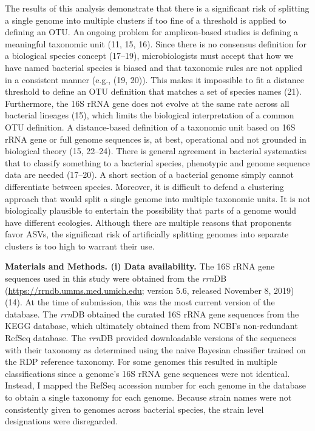 \documentclass[
]{article}
\begin{document}
The results of this analysis demonstrate that there is a significant
risk of splitting a single genome into multiple clusters if too fine of
a threshold is applied to defining an OTU. An ongoing problem for
amplicon-based studies is defining a meaningful taxonomic unit (11, 15,
16). Since there is no consensus definition for a biological species
concept (17--19), microbiologists must accept that how we have named
bacterial species is biased and that taxonomic rules are not applied in
a consistent manner (e.g., (19, 20)). This makes it impossible to fit a
distance threshold to define an OTU definition that matches a set of
species names (21). Furthermore, the 16S rRNA gene does not evolve at
the same rate across all bacterial lineages (15), which limits the
biological interpretation of a common OTU definition. A distance-based
definition of a taxonomic unit based on 16S rRNA gene or full genome
sequences is, at best, operational and not grounded in biological theory
(15, 22--24). There is general agreement in bacterial systematics that
to classify something to a bacterial species, phenotypic and genome
sequence data are needed (17--20). A short section of a bacterial genome
simply cannot differentiate between species. Moreover, it is difficult
to defend a clustering approach that would split a single genome into
multiple taxonomic units. It is not biologically plausible to entertain
the possibility that parts of a genome would have different ecologies.
Although there are multiple reasons that proponents favor ASVs, the
significant risk of artificially splitting genomes into separate
clusters is too high to warrant their use.

\vspace{20mm}

\textbf{Materials and Methods. (i) Data availability.} The 16S rRNA gene
sequences used in this study were obtained from the \emph{rrn}DB
(\url{https://rrndb.umms.med.umich.edu}; version 5.6, released November
8, 2019) (14). At the time of submission, this was the most current
version of the database. The \emph{rrn}DB obtained the curated 16S rRNA
gene sequences from the KEGG database, which ultimately obtained them
from NCBI's non-redundant RefSeq database. The \emph{rrn}DB provided
downloadable versions of the sequences with their taxonomy as determined
using the naive Bayesian classifier trained on the RDP reference
taxonomy. For some genomes this resulted in multiple classifications
since a genome's 16S rRNA gene sequences were not identical. Instead, I
mapped the RefSeq accession number for each genome in the database to
obtain a single taxonomy for each genome. Because strain names were not
consistently given to genomes across bacterial species, the strain level
designations were disregarded.
\end{document}
